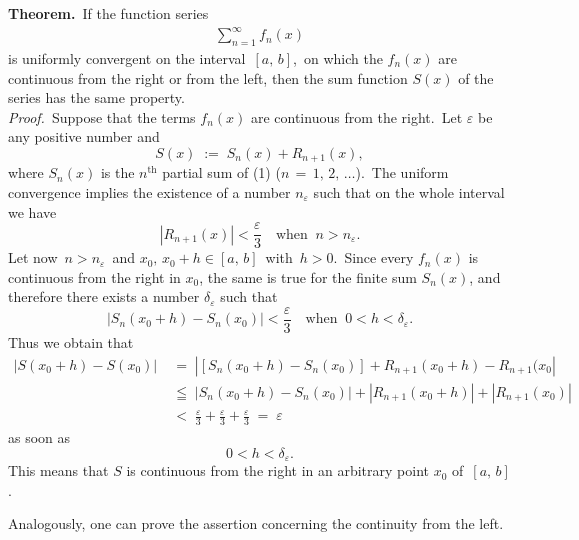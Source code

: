 \documentclass[12pt]{article}
\theoremstyle{definition}
\begin{document}
\textbf{Theorem.}\, If the function series
\begin{align}
\sum_{n=1}^\infty f_n(x)
\end{align}
is uniformly convergent on the interval \,$[a,\,b]$,\, on which the  $f_n(x)$ are continuous from the right or from the left, then the sum function $S(x)$ of the series has the same property.\\


{\em Proof.}\, Suppose that the terms $f_n(x)$ are continuous from the right.\, Let $\varepsilon$ be any positive number and
               $$S(x) \;:=\; S_n(x)+R_{n+1}(x),$$
where $S_n(x)$ is the $n^\mathrm{th}$ partial sum of (1) ($n \,=\, 1,\,2,\,\ldots$).\, The uniform convergence implies the existence of a number $n_\varepsilon$ such that on the whole interval we have
     $$|R_{n+1}(x)| < \frac{\varepsilon}{3} \quad \mathrm{when}\;\; n > n_\varepsilon. $$
Let now\, $n > n_\varepsilon$\, and\; $x_0,\, x_0\!+\!h \in [a,\,b]$\, with\, $h > 0$.\, Since every $f_n(x)$ is continuous from the right in $x_0$, the same is true for the finite sum $S_n(x)$, and therefore there exists a number $\delta_\varepsilon$ such that
             $$|S_n(x_0\!+\!h)-S_n(x_0)| < \frac{\varepsilon}{3} \quad \mathrm{when}\;\; 0 < h < \delta_\varepsilon.$$
Thus we obtain that
\begin{align*}
|S(x_0\!+\!h)-S(x_0)| & \;=\; |[S_n(x_0\!+\!h)-S_n(x_0)]+R_{n+1}(x_0\!+\!h)-R_{n+1}(x_0|\\
                      & \;\leqq\; |S_n(x_0\!+\!h)-S_n(x_0)|+|R_{n+1}(x_0\!+\!h)|+|R_{n+1}(x_0)|\\
                      & \;<\; \frac{\varepsilon}{3}\!+\!\frac{\varepsilon}{3}\!+\!\frac{\varepsilon}{3} \;=\; \varepsilon
\end{align*}
as soon as
$$0 < h < \delta_\varepsilon.$$
This means that $S$ is continuous from the right in an arbitrary point $x_0$ of\, $[a,\,b]$.

Analogously, one can prove the assertion concerning the continuity from the left.
\end{document}

